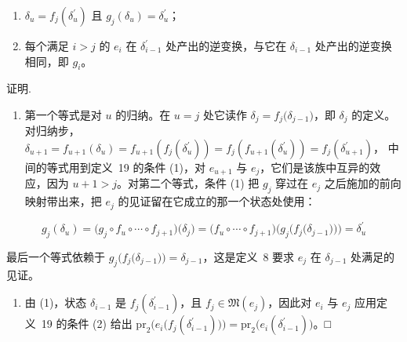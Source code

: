 \begin{enumerate}
\def\labelenumi{\arabic{enumi}.}
\item
  \(\delta _ { u } = f _ { j } ( \delta _ { u } ^ { \prime } )\) 且
  \(g _ { j } ( \delta _ { u } ) = \delta _ { u } ^ { \prime }\)；
\item
  每个满足 \(i > j\) 的 \(e _ { i }\) 在 \(\delta _ { i - 1 } ^ { \prime }\) 处产出的逆变换，与它在
  \(\delta _ { i - 1 }\) 处产出的逆变换相同，即 \(g _ { i }\)。
\end{enumerate}

证明.

\begin{enumerate}
\def\labelenumi{\arabic{enumi}.}
\tightlist
\item
  第一个等式是对 \(u\) 的归纳。在 \(u = j\) 处它读作
  \(\delta _ { j } = f _ { j } \big ( \delta _ { j - 1 } \big )\)，即 \(\delta _ { j }\) 的定义。对归纳步，
  \(\delta _ { u + 1 } = f _ { u + 1 } ( \delta _ { u } ) = f _ { u + 1 } ( f _ { j } ( \delta _ { u } ^ { \prime } ) ) = f _ { j } ( f _ { u + 1 } ( \delta _ { u } ^ { \prime } ) ) = f _ { j } \left( \delta _ { u + 1 } ^ { \prime } \right)\)，
  中间的等式用到定义~19 的条件 (1)，对 \(e _ { u + 1 }\) 与 \(e _ { j }\)，它们是该族中互异的效应，因为 \(u + 1 > j\)。对第二个等式，条件 (1) 把 \(g _ { j }\) 穿过在 \(e _ { j }\) 之后施加的前向映射带出来，把 \(e _ { j }\) 的见证留在它成立的那一个状态处使用：
\end{enumerate}

\[
g _ { j } ( \delta _ { u } ) = \bigl ( g _ { j } \circ f _ { u } \circ \cdots \circ f _ { j + 1 } \bigr ) \bigl ( \delta _ { j } \bigr ) = \bigl ( f _ { u } \circ \cdots \circ f _ { j + 1 } \bigr ) \bigl ( g _ { j } \bigl ( f _ { j } \bigl ( \delta _ { j - 1 } \bigr ) \bigr ) \bigr ) = \delta _ { u } ^ { \prime }
\]

最后一个等式依赖于
\(g _ { j } \big ( f _ { j } \big ( \delta _ { j - 1 } \big ) \big ) = \delta _ { j - 1 }\)，这是定义~8 要求 \(e _ { j }\) 在
\(\delta _ { j - 1 }\) 处满足的见证。

\begin{enumerate}
\def\labelenumi{\arabic{enumi}.}
\setcounter{enumi}{1}
\tightlist
\item
  由 (1)，状态 \(\delta _ { i - 1 }\) 是 \(f _ { j } ( \delta _ { i - 1 } ^ { \prime } )\)，且
  \(f _ { j } \in \mathfrak { M } ( e _ { j } )\)，因此对 \(e _ { i }\) 与 \(e _ { j }\) 应用定义~19 的条件 (2) 给出
  \(\mathrm { p r } _ { 2 } \big ( e _ { i } \big ( f _ { j } ( \delta _ { i - 1 } ^ { \prime } ) \big ) \big ) = \mathrm { p r } _ { 2 } \big ( e _ { i } ( \delta _ { i - 1 } ^ { \prime } ) \big )\)。□
\end{enumerate}

